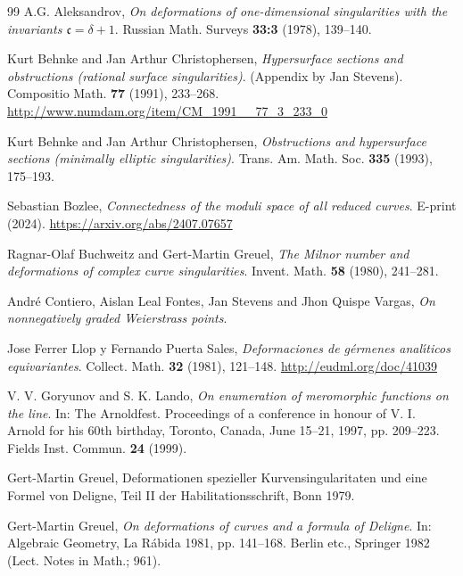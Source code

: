 \documentclass[12pt,a4paper]{amsart}  %
\theoremstyle{definition}
\theoremstyle{remark}
\begin{document}
\begin{thebibliography}{99}
 A.G. Aleksandrov, 
 {\sl On deformations of one-dimensional singularities with the invariants
 ${\mathfrak c}=\delta+1$\/}. 
 Russian Math. Surveys {\bf 33:3} (1978), 139--140.\\
 


  Kurt Behnke and Jan Arthur Christophersen, 
  {\sl Hypersurface sections and obstructions (rational surface 
  singularities)\/}. (Appendix by Jan Stevens).
  Compositio Math. {\bf 77} (1991), 233--268.
\url{http://www.numdam.org/item/CM_1991__77_3_233_0}

  Kurt Behnke and Jan Arthur Christophersen, 
  {\sl Obstructions and hypersurface sections (minimally elliptic singularities)\/}.
Trans. Am. Math. Soc. {\bf335} (1993),  175--193. 

Sebastian Bozlee,
{\sl Connectedness of the moduli space of all reduced curves\/}.
 E-print (2024).    
   \url{https://arxiv.org/abs/2407.07657} 



Ragnar-Olaf Buchweitz and Gert-Martin Greuel, 
{\sl The Milnor number and deformations of complex curve singularities\/}.
Invent. Math. {\bf58} (1980), 241--281.\\

Andr\'e Contiero, Aislan Leal Fontes, Jan Stevens and Jhon Quispe Vargas,
{\sl On nonnegatively graded Weierstrass points\/}. 

 Jose Ferrer Llop y Fernando Puerta Sales, 
 {\sl Deformaciones de g\'ermenes anal\'\i\-ticos equivariantes\/}. 
 Collect. Math. {\bf 32} (1981), 121--148. 
\url{http://eudml.org/doc/41039}

V. V. Goryunov and S. K. Lando,
{\sl On enumeration of meromorphic functions on the line\/}.
In: The Arnoldfest. Proceedings of a conference in honour of V. I. Arnold for his 60th birthday, Toronto, Canada, June 15--21, 1997, pp. 209--223.
Fields Inst. Commun. \textbf{24} (1999).

Gert-Martin Greuel, 
Deformationen spezieller Kurvensingularitaten
und eine Formel von Deligne, Teil II der Habilitationsschrift,
Bonn 1979.



  Gert-Martin Greuel, 
  {\sl On deformations of curves and a formula of De\-ligne\/}. 
  In: Algebraic Geometry, La R\'abida 1981, pp. 141--168.
  Berlin etc., Springer 1982 (Lect. Notes in Math.; 961).
  

\end{thebibliography}
\end{document}
